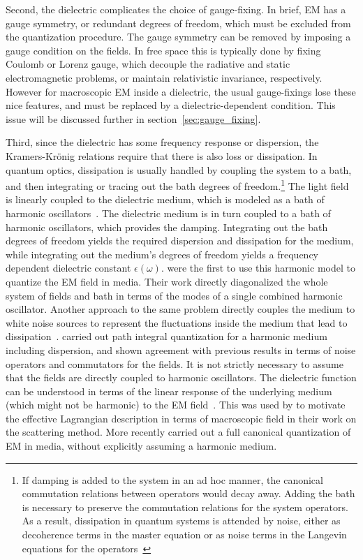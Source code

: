 Second, the dielectric complicates the choice of gauge-fixing.  
In brief, EM has a gauge symmetry, or redundant degrees of freedom, which must be 
excluded from the quantization procedure.  
The gauge symmetry can be removed by imposing a gauge condition on the fields.
  In free space this is typically done by fixing Coulomb or Lorenz gauge, which 
decouple the radiative and static electromagnetic problems, or maintain relativistic invariance, respectively.
However for macroscopic EM inside a dielectric, the usual gauge-fixings lose these nice
features, and must be replaced by a dielectric-dependent condition.  
This issue will be discussed further in section~\ref{sec:gauge_fixing}.

Third, since the dielectric has some frequency response or dispersion, the Kramers-Kr\"onig relations 
require that there is also loss or dissipation.  
In  quantum optics, dissipation is usually handled by coupling the system to a bath, and then
integrating or tracing out the bath degrees of freedom.\footnote{If damping is added to the system in an ad hoc
manner, the canonical commutation relations between operators would decay away.
Adding the bath is necessary to preserve the commutation relations for the system operators.
 As a result, dissipation in quantum systems is attended by noise, 
either as decoherence terms in the master equation or as noise terms in the Langevin equations for the operators~\citep{GardinerZoller2004}}
The light field is linearly coupled to the dielectric medium, which is modeled
as a bath of harmonic oscillators~\citep{Huttner1992,Dung1998,Bechler1999}.
The dielectric medium is in turn coupled to a bath of harmonic oscillators, which provides the damping.
Integrating out the bath degrees of freedom yields the required dispersion and dissipation for the medium, 
while integrating out the medium's degrees of freedom yields a frequency dependent dielectric constant $\epsilon(\omega)$.
\citet{Huttner1992} were the first to use this harmonic model to quantize the EM field in media. Their
work directly diagonalized the whole system of fields and bath in terms of the modes of 
a single combined harmonic oscillator.
Another approach to the same problem directly couples the medium to white noise sources to represent the fluctuations 
inside the medium that lead to dissipation~\citep{Scheel1998,Dung1998,Tip2001}.
\citet{Bechler1999,Bechler2006} carried out path integral quantization for a harmonic medium 
including dispersion, and shown agreement with previous results in terms 
of noise operators and commutators for the fields.  
It is not strictly necessary to assume that the fields are directly coupled to harmonic oscillators. 
The dielectric function can be understood in terms of the linear response of the underlying 
medium (which might not be harmonic) to the EM field~\citep{Altland2011}.  
This was used by \citet{Rahi2009} to motivate the effective Lagrangian description in terms of macroscopic field in their 
work on the scattering method.  
More recently \citet{Philbin2010} carried out a full canonical quantization of EM in media, without explicitly 
assuming a harmonic medium.


